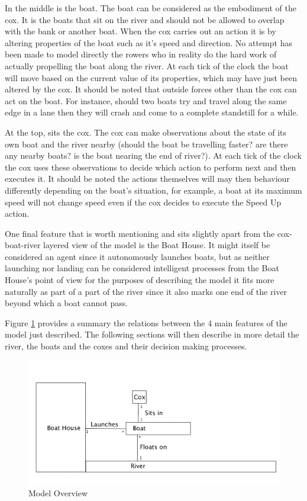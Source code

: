     In the middle is the boat. The boat can be considered as the embodiment of the cox. It is the boats that sit on the river and should not be allowed to overlap with the bank or another boat. When the cox carries out an action it is by altering properties of the boat such as it's speed and direction. No attempt has been made to model directly the rowers who in reality do the hard work of actually propelling the boat along the river. At each tick of the clock the boat will move based on the current value of its properties, which may have just been altered by the cox. It should be noted that outside forces other than the cox can act on the boat. For instance, should two boats try and travel along the same edge in a lane then they will crash and come to a complete standstill for a while.
    
    At the top, sits the cox. The cox can make observations about the state of its own boat and the river nearby (should the boat be travelling faster? are there any nearby boats? is the boat nearing the end of river?). At each tick of the clock the cox uses these observations to decide which action to perform next and then executes it. It should be noted the actions themselves will may then behaviour differently depending on the boat's situation, for example, a boat at its maximum speed will not change speed even if the cox decides to execute the Speed Up action.
    
    One final feature that is worth mentioning and sits slightly apart from the cox-boat-river layered view of the model is the Boat House. It might itself be considered an agent since it autonomously launches boats, but as neither launching nor landing can be considered intelligent processes from the Boat House's point of view for the purposes of describing the model it fits more naturally as part of a part of the river since it also marks one end of the river beyond which a boat cannot pass.
    
    Figure \ref{fig:modeloverview} provides a summary the relations between the 4 main features of the model just described. The following sections will then describe in more detail the river, the boats and the coxes and their decision making processes.
    
    \begin{figure}[H]
    \begin{center}
    	\includegraphics[scale=0.3]{images/ModelOverview.png}
    	\caption{Model Overview}
    	\label{fig:modeloverview}
    \end{center}
    \end{figure}

